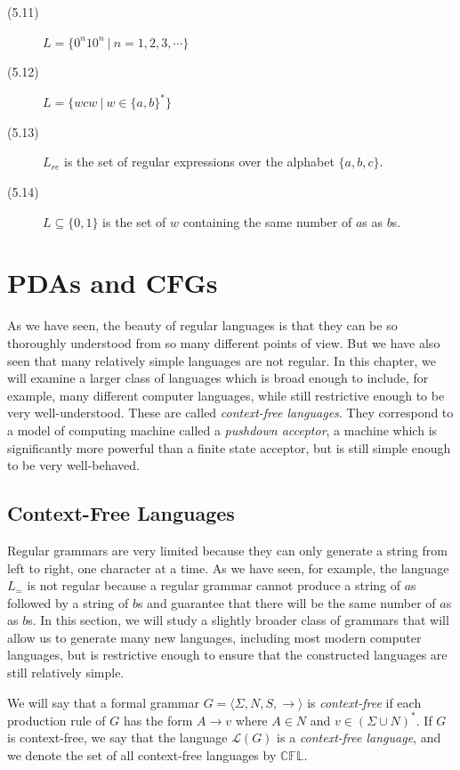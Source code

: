\documentclass{article}
\newcommand{\El}{\mathcal L}
\begin{document}
\begin{description}
  \item[(5.11)] $L = \{ 0^n 10^n\ |\ n=1,2,3,\cdots \}$ 
  \item[(5.12)] $L = \{ wcw\ |\ w \in \{a,b\}^* \}$ 
  \item[(5.13)] $L_{re}$ is the set of regular expressions over the alphabet $\{a,b,c\}$. 
  \item[(5.14)] $L \subseteq \{0,1\}$ is the set of $w$ containing the same number of $a$s as $b$s.
\end{description}




\newpage


\section{PDAs and CFGs}


As we have seen, the beauty of regular languages is that they can be so thoroughly understood from so many different points of view. But we have also seen that many relatively simple languages are not regular. In this chapter, we will examine a larger class of languages which is broad enough to include, for example, many different computer languages, while still restrictive enough to be very well-understood. These are called \emph{context-free languages}. They correspond to a model of computing machine called a \emph{pushdown acceptor}, a machine which is significantly more powerful than a finite state acceptor, but is still simple enough to be very well-behaved. 


\subsection{Context-Free Languages} %


Regular grammars are very limited because they can only generate a string from left to right, one character at a time. As we have seen, for example, the language $L_=$ is not regular because a regular grammar cannot produce a string of $a$s followed by a string of $b$s and guarantee that there will be the same number of $a$s as $b$s. In this section, we will study a slightly broader class of grammars that will allow us to generate many new languages, including most modern computer languages, but is restrictive enough to ensure that the constructed languages are still relatively simple.

We will say that a formal grammar $G = \langle \Sigma, N, S, \to \rangle$ is \emph{context-free} if each production rule of $G$ has the form $A \to v$ where $A \in N$ and $v \in (\Sigma \cup N)^*$. If $G$ is context-free, we say that the language $\El (G)$ is a \emph{context-free language}, and we denote the set of all context-free languages by $\mathbb{CFL}$.
\end{document}
